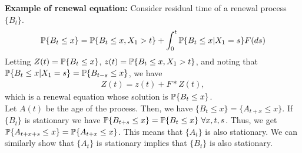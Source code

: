 \documentclass[all-lectures.tex]{subfiles}
\begin{document}
\textbf{Example of renewal equation:} Consider residual time of a renewal process $\{B_t\}$.
\begin{align*}
\P\{B_t \leq x\} = \P\{B_t \leq x,X_1>t\} + \int_{0}^{t} \P\{B_t \leq x|X_1=s\}F(ds)
\end{align*}
Letting  $Z(t) = \P\{B_t \leq x\}$, $z(t) = \P\{B_t \leq x,X_1>t\}$, and noting that $\P\{B_t \leq x|X_1=s\} = \P\{B_{t-s} \leq x\}$, we have 
\begin{align*}
Z(t) = z(t) + F*Z(t),
\end{align*}
which is a renewal equation whose solution is $\P\{B_t\leq x\}$. \\
\indent Let $A(t)$ be the age of the process. Then, we have $\{B_t \leq x\} = \{A_{t+x} \leq x\}$. If $\{B_t\}$ is stationary we have $\P\{B_{t+s} \leq x\} = \P\{B_t \leq x\}\ \forall x,t,s$. Thus, we get $\P\{A_{t+x+s} \leq x\} = \P\{A_{t+x} \leq x\}$. This means that $\{A_t\}$ is also stationary. We can similarly show that $\{A_t\}$ is stationary implies that $\{B_t\}$ is also stationary.
\end{document}
